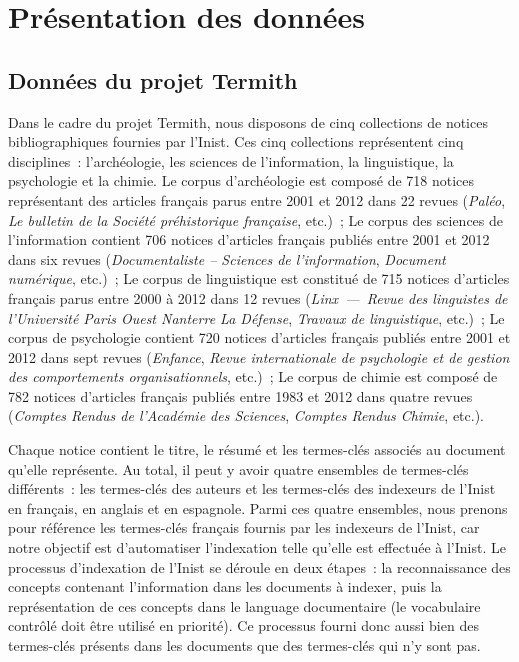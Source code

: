 \chapter{Présentation des données}
  \section{Données du projet Termith}
    Dans le cadre du projet Termith, nous disposons de cinq collections de
    notices bibliographiques fournies par l'Inist. Ces cinq collections
    représentent cinq disciplines~: l'archéologie, les sciences de
    l'information, la linguistique, la psychologie et la chimie. Le corpus
    d'archéologie est composé de 718 notices représentant des articles français
    parus entre 2001 et 2012 dans 22 revues (\textit{Paléo}, \textit{Le bulletin
    de la Société préhistorique française}, etc.)~; Le corpus des sciences de
    l'information contient 706 notices d'articles français publiés entre 2001 et
    2012 dans six revues (\textit{Documentaliste -- Sciences de l'information},
    \textit{Document numérique}, etc.)~; Le corpus de linguistique est constitué
    de 715 notices d'articles français parus entre 2000 à 2012 dans 12 revues
    (\textit{Linx~---~Revue des linguistes de l'Université Paris Ouest Nanterre
    La Défense}, \textit{Travaux de linguistique}, etc.)~; Le corpus de
    psychologie contient 720 notices d'articles français publiés entre 2001 et
    2012 dans sept revues (\textit{Enfance}, \textit{Revue internationale de
    psychologie et de gestion des comportements organisationnels}, etc.)~; Le
    corpus de chimie est composé de 782 notices d'articles français publiés
    entre 1983 et 2012 dans quatre revues (\textit{Comptes Rendus de l'Académie
    des Sciences}, \textit{Comptes Rendus Chimie}, etc.).
    
    Chaque notice contient le titre, le résumé et les termes-clés associés au
    document qu'elle représente. Au total, il peut y avoir quatre ensembles de
    termes-clés différents~: les termes-clés des auteurs et les termes-clés des
    indexeurs de l'Inist en français, en anglais et en espagnole. Parmi ces
    quatre ensembles, nous prenons pour référence les termes-clés français
    fournis par les indexeurs de l'Inist, car notre objectif est d'automatiser
    l'indexation telle qu'elle est effectuée à l'Inist. Le processus
    d'indexation de l'Inist se déroule en deux étapes~: la reconnaissance des
    concepts contenant l'information dans les documents à indexer, puis la
    représentation de ces concepts dans le language documentaire (le vocabulaire
    contrôlé doit être utilisé en priorité). Ce processus fourni donc aussi bien
    des termes-clés présents dans les documents que des termes-clés qui n'y sont
    pas.

